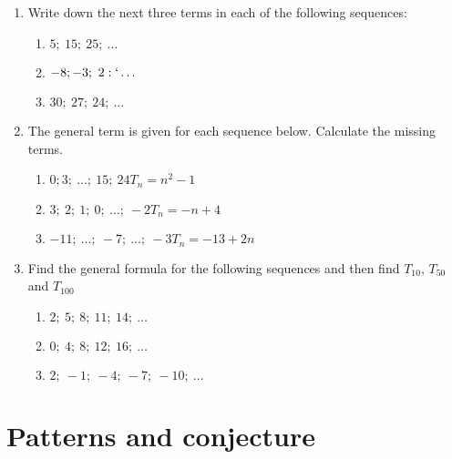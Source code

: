 \begin{exercises}{}
{ 

\begin{enumerate}[noitemsep, label=\textbf{\arabic*}. ] 
\item Write down the next three terms in each of the following sequences:

  \begin{enumerate} [noitemsep, label=\textbf{(\alph*)} ]
  \item $5;~15;~25;~\ldots$
  \item $-8;-3;~2:`\ldots$
  \item $30;~27;~24;~\ldots$
  \end{enumerate}
 \item The general term is given for each sequence below. Calculate the missing terms.
  \begin{enumerate} [noitemsep, label=\textbf{(\alph*)} ]
  \item $0;3;~\ldots;~15;~24$\hspace{2.2cm}$T_{n}={n}^{2}-1$
  \item $3;~2;~1;~0;~\ldots;~-2$\hspace{2cm}$T_{n}=-n+4$
  \item $-11;~\ldots;~-7;~\ldots;~-3$\hspace{1.5cm}$T_{n}=-13+2n$
  \end{enumerate}
     
\item Find the general formula for the following sequences and then find ${T}_{10}$, ${T}_{50}$ and ${T}_{100}$
  \begin{enumerate}[noitemsep, label=\textbf{(\alph*)} ]
  \item $2;~5;~8;~11;~14;~\ldots$
  \item $0;~4;~8;~12;~16;~\ldots$
  \item $2;~-1;~-4;~-7;~-10;~\ldots$
  \end{enumerate}
\end{enumerate}
}%
\end{exercises}


\section{Patterns and conjecture}


